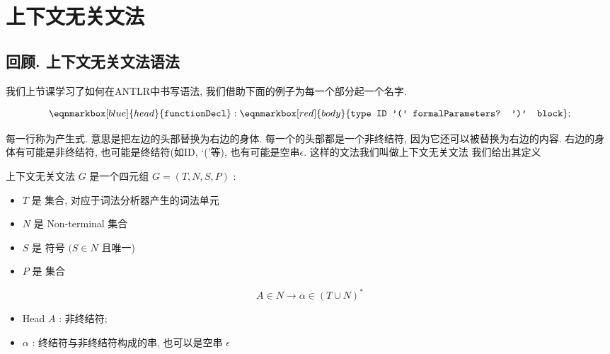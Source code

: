 \documentclass{ctexart}
\begin{document}
\section{上下文无关文法}

\subsection{回顾. 上下文无关文法语法}

我们上节课学习了如何在ANTLR中书写语法, 我们借助下面的例子为每一个部分起一个名字. 

\begin{example}
    \begin{equation*}
        \eqnmarkbox[blue]{head}{\texttt{functionDecl}} : \eqnmarkbox[red]{body}{\texttt{type ID '(' formalParameters? ')' block}};  
\end{equation*}


每一行称为产生式. 意思是把左边的头部替换为右边的身体. 每一个的头部都是一个非终结符, 因为它还可以被替换为右边的内容. 右边的身体有可能是非终结符, 也可能是终结符(如ID, `('等), 也有可能是空串$\epsilon$. 这样的文法我们叫做上下文无关文法 我们给出其定义
\end{example}

\begin{definition}
    上下文无关文法 $G$ 是一个四元组 $G=(T, N, S, P)$ :
    \begin{itemize}
        \item  $T$ 是 集合, 对应于词法分析器产生的词法单元
        \item $N$ 是 {Non-terminal} 集合
        \item $S$ 是 符号 $(S \in N$ 且唯一)
        \item $P$ 是 集合
    \end{itemize}
    $$
A \in N \longrightarrow \alpha \in(T \cup N)^*
$$
\begin{itemize}
    \item {} {Head} $A$ : 非终结符; 
    \item {}  $\alpha$ : 终结符与非终结符构成的串, 也可以是空串 $\epsilon$
\end{itemize}
\end{definition}
\end{document}

